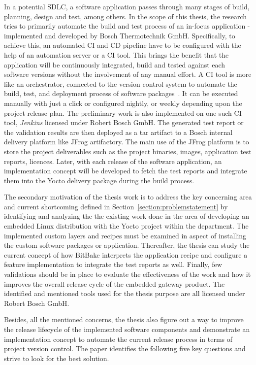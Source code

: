 In a potential \ac{SDLC}, a software application passes through many stages of build, planning, design and test, among others. In the scope of this thesis, the research tries to primarily automate the build and test process of an in-focus application - implemented and developed by Bosch Thermotechnik GmbH. Specifically, to achieve this, an automated \ac{CI} and \ac{CD} pipeline have to be configured with the help of an automation server or a \ac{CI} tool. This brings the benefit that the application will be continuously integrated, build and tested against each software versions without the involvement of any manual effort. A \ac{CI} tool is more like an orchestrator, connected to the version control system to automate the build, test, and deployment process of software packages~\parencite{pathania2017learning}. It can be executed manually with just a click or configured nightly, or weekly depending upon the project release plan. The preliminary work is also implemented on one such \ac{CI} tool, \emph{Jenkins} licensed under Robert Bosch GmbH. The generated test report or the validation results are then deployed as a tar artifact to a Bosch internal delivery platform like JFrog artifactory. The main use of the JFrog platform is to store the project deliverables such as the project binaries, images, application test reports, licences. Later, with each release of the software application, 
an implementation concept will be developed to fetch the test reports and integrate them into the Yocto delivery package during the build process.

The secondary motivation of the thesis work is to address the key concerning area and current shortcoming defined in Section~\ref{section:problemstatement} by identifying and analyzing the the existing work done in the area of developing an embedded Linux distribution with the Yocto project within the department. The implemented custom layers and recipes must be examined in aspect of installing the custom software packages or application. Thereafter, the thesis can study the current concept of how BitBake interprets the application recipe and configure a feature implementation to integrate the test reports as well. Finally, few validations should be in place to evaluate the effectiveness of the work and how it improves the overall release cycle of the embedded gateway product. The identified and mentioned tools used for the thesis purpose are all licensed under Robert Bosch GmbH.

Besides, all the mentioned concerns, the thesis also figure out a way to improve the release lifecycle of the implemented software components and demonstrate an implementation concept to automate the current release process in terms of project version control. The paper identifies the following five key questions and strive to look for the best solution.
  
